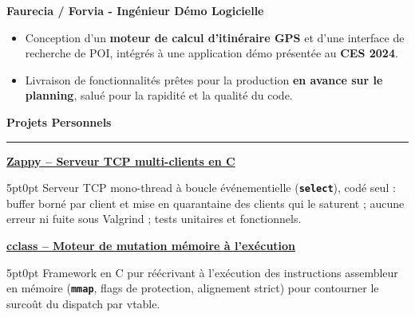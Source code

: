 \documentclass[9pt]{extarticle}
\begin{document}
\par\vspace{5pt}

{\bfseries Faurecia / Forvia - Ingénieur Démo Logicielle}
\begin{itemize}[noitemsep, topsep=0pt]
	\item Conception d'un {\bfseries moteur de calcul d'itinéraire GPS} et d'une interface de recherche de POI, intégrés à une application démo présentée au {\bfseries CES 2024}.
	\item Livraison de fonctionnalités prêtes pour la production {\bfseries en avance sur le planning}, salué pour la rapidité et la qualité du code.
\end{itemize}

\par\vspace{5pt}


{\large\bfseries Projets Personnels}
\par\vspace{-8pt}
\rule{\linewidth}{0.4pt}
\par\vspace{5pt}

\underline{\bfseries Zappy -- Serveur TCP multi-clients en C}
\par
\begin{adjustwidth}{5pt}{0pt}
    Serveur TCP mono-thread à boucle événementielle ({\bfseries \texttt{select}}), codé seul : buffer borné par client et mise en quarantaine des clients qui le saturent ; aucune erreur ni fuite sous Valgrind ; tests unitaires et fonctionnels.
\end{adjustwidth}

\par\vspace{8pt}

\underline{\bfseries \href{https://github.com/paulogarithm/cclass}{cclass} -- Moteur de mutation mémoire à l'exécution}
\par
\begin{adjustwidth}{5pt}{0pt}
    Framework en C pur réécrivant à l'exécution des instructions assembleur en mémoire ({\bfseries \texttt{mmap}}, flags de protection, alignement strict) pour contourner le surcoût du dispatch par vtable.
\end{adjustwidth}

\par\vspace{8pt}
\end{document}
